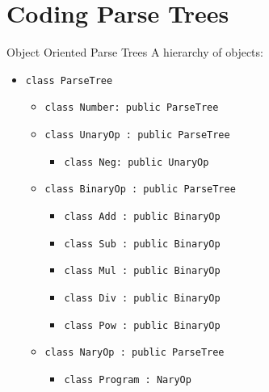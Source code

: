 \documentclass[handout]{beamer}
\newenvironment{code}{%
 \VerbatimEnvironment
 \begin{adjustbox}{max width=\textwidth, max height=0.7\textheight}
 \begin{BVerbatim}
  }{
  \end{BVerbatim}
 \end{adjustbox}
}
\begin{document}


\section{Coding Parse Trees}
\begin{frame}{Object Oriented Parse Trees}
    A hierarchy of objects:
    \begin{itemize}
        \item \texttt{class ParseTree}
            \begin{itemize}
                \item \texttt{class Number: public ParseTree}
                \item \texttt{class UnaryOp : public ParseTree}
                \begin{itemize}
                    \item \texttt{class Neg: public UnaryOp }
                \end{itemize}
                \item \texttt{class BinaryOp : public ParseTree}
                \begin{itemize}
                    \item \texttt{class Add : public BinaryOp}
                    \item \texttt{class Sub : public BinaryOp}
                    \item \texttt{class Mul : public BinaryOp}
                    \item \texttt{class Div : public BinaryOp}
                    \item \texttt{class Pow : public BinaryOp}
                \end{itemize}
                \item \texttt{class NaryOp : public ParseTree}
                \begin{itemize}
                    \item \texttt{class Program : NaryOp}
                \end{itemize}
            \end{itemize}
        \end{itemize}
\end{frame}
\end{document}
